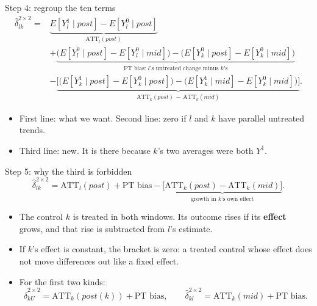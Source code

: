 \documentclass[
  11pt,
  ignorenonframetext,
  aspectratio=169,
]{beamer}
\providecommand{\tightlist}{%
  \setlength{\itemsep}{0pt}\setlength{\parskip}{0pt}}
\begin{document}
\begin{frame}{Step 4: regroup the ten terms}
\protect{}\label{step-4-regroup-the-ten-terms}
\[
\begin{aligned}
\hat\delta^{2\times2}_{lk} ={}& \underbrace{E[Y^1_l \mid post] - E[Y^0_l \mid post]}_{\text{ATT}_l(post)} \\[2pt]
&+ \underbrace{\big(E[Y^0_l \mid post] - E[Y^0_l \mid mid]\big) - \big(E[Y^0_k \mid post] - E[Y^0_k \mid mid]\big)}_{\text{PT bias: } l\text{'s untreated change minus } k\text{'s}} \\[2pt]
&- \underbrace{\Big[\big(E[Y^1_k \mid post] - E[Y^0_k \mid post]\big) - \big(E[Y^1_k \mid mid] - E[Y^0_k \mid mid]\big)\Big]}_{\text{ATT}_k(post) \,-\, \text{ATT}_k(mid)} .
\end{aligned}
\]

\begin{itemize}
\tightlist
\item
  First line: what we want. Second line: zero if \(l\) and \(k\) have
  parallel untreated trends.
\item
  Third line: new. It is there because \(k\)'s two averages were both
  \(Y^1\).
\end{itemize}
\end{frame}

\begin{frame}{Step 5: why the third is forbidden}
\protect{}\label{step-5-why-the-third-is-forbidden}
\[
\hat\delta^{2\times2}_{lk} = \text{ATT}_l(post) + \text{PT bias} - \underbrace{\big[\text{ATT}_k(post) - \text{ATT}_k(mid)\big]}_{\text{growth in } k\text{'s own effect}} .
\]

\begin{itemize}
\tightlist
\item
  The control \(k\) is treated in both windows. Its outcome rises if its
  \textbf{effect} grows, and that rise is subtracted from \(l\)'s
  estimate.
\item
  If \(k\)'s effect is constant, the bracket is zero: a treated control
  whose effect does not move differences out like a fixed effect.
\item
  For the first two kinds: \[
  \hat\delta^{2\times2}_{kU} = \text{ATT}_k(post(k)) + \text{PT bias}, \qquad \hat\delta^{2\times2}_{kl} = \text{ATT}_k(mid) + \text{PT bias}.
  \]
\end{itemize}
\end{frame}
\end{document}

